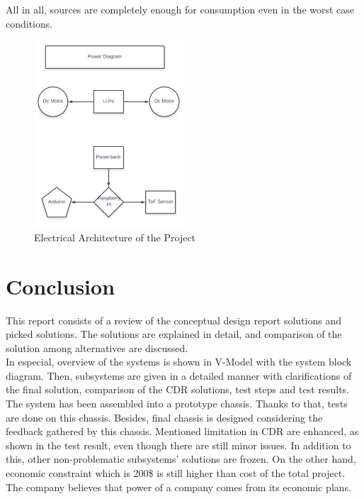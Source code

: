 \documentclass[a4paper,12pt]{article}
\begin{document}
All in all, sources are completely enough for consumption even in the worst case conditions.   


\begin{figure}[H]

\includegraphics[width=0.5\textwidth,center]{images/elec_arch}

\caption{Electrical Architecture of the Project}\label{fig:elec}

\end{figure}


\newpage


\section{Conclusion}

This report consists of a review of the conceptual design report solutions and picked solutions. The solutions are explained in detail, and comparison of the solution among alternatives are discussed. \\

In especial, overview of the systems is shown in V-Model with the system block diagram. Then, subsystems are given in a detailed manner with clarifications of the final solution, comparison of the CDR solutions, test steps and test results. The system has been assembled into a prototype chassis. Thanks to that, tests are done on this chassis. Besides, final chassis is designed considering the feedback gathered by this chassis. Mentioned limitation in CDR are enhanced, as shown in the test result, even though there are still minor issues. In addition to this, other non-problematic subsystems’ solutions are frozen. On the other hand, economic constraint which is 200\$ is still higher than cost of the total project. The company believes that power of a company comes from its economic plans. \\
\end{document}
